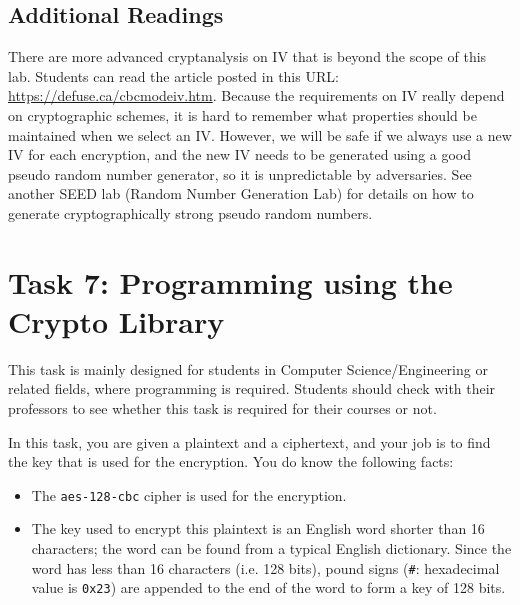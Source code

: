 


\subsection{Additional Readings}

There are more advanced cryptanalysis on IV that is beyond the scope of this lab. Students 
can read the article posted in this URL: \url{https://defuse.ca/cbcmodeiv.htm}. 
Because the requirements on IV really depend on cryptographic schemes, it is hard to
remember what properties should be maintained when we select an IV.
However, we will be safe if we always use a new IV for each encryption, and the 
new IV needs to be generated using a good pseudo random number 
generator, so it is unpredictable by adversaries. 
See another SEED lab (Random Number Generation Lab) for 
details on how to generate cryptographically strong pseudo random numbers. 



\section{Task 7: Programming using the Crypto Library}

This task is mainly designed for students in Computer Science/Engineering
or related fields, where programming is required. Students should
check with their professors to see whether this task is required 
for their courses or not.


In this task, you are given a plaintext and a ciphertext, and 
your job is to find the key that is used for the encryption. 
You do know the following facts:

\begin{itemize} 
\item The {\tt aes-128-cbc} cipher is used for the encryption. 
\item The key used to encrypt this plaintext is an English
word shorter than 16 characters; the word can be found from a typical 
English dictionary.  Since the word has less than 16 characters (i.e. 128
bits), pound signs (\texttt{\#}: hexadecimal value is \texttt{0x23}) 
are appended to the end of the word to form a key of 128 bits.
\end{itemize} 
  

